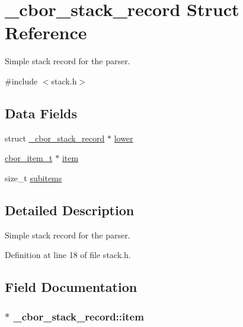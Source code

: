 \hypertarget{struct__cbor__stack__record}{\section{\-\_\-cbor\-\_\-stack\-\_\-record Struct Reference}
\label{struct__cbor__stack__record}
}


Simple stack record for the parser.  




{\ttfamily \#include $<$stack.\-h$>$}

\subsection*{Data Fields}
\begin{DoxyCompactItemize}
\item 
struct \hyperlink{struct__cbor__stack__record}{\-\_\-cbor\-\_\-stack\-\_\-record} $\ast$ \hyperlink{struct__cbor__stack__record_aca7db1e610ee0983b0e24e081ee3e5dd}{lower}
\item 
\hyperlink{structcbor__item__t}{cbor\-\_\-item\-\_\-t} $\ast$ \hyperlink{struct__cbor__stack__record_a1a1d4be830fa1e0d9c5369cddccce47e}{item}
\item 
size\-\_\-t \hyperlink{struct__cbor__stack__record_a9b69c0ea00da449b080343a97c026cef}{subitems}
\end{DoxyCompactItemize}


\subsection{Detailed Description}
Simple stack record for the parser. 

Definition at line 18 of file stack.\-h.



\subsection{Field Documentation}
\hypertarget{struct__cbor__stack__record_a1a1d4be830fa1e0d9c5369cddccce47e}{
\subsubsection[{item}]{$\ast$ \-\_\-cbor\-\_\-stack\-\_\-record\-::item}}\label{struct__cbor__stack__record_a1a1d4be830fa1e0d9c5369cddccce47e}


